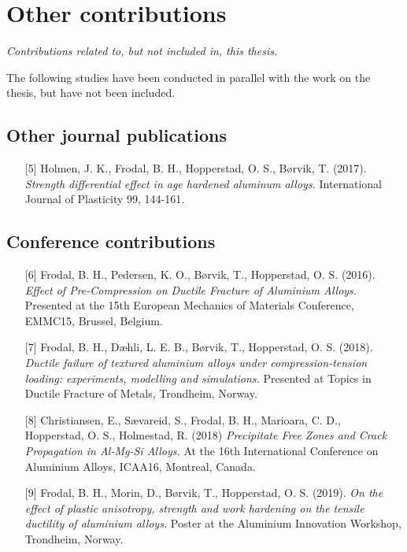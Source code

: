 \newpage

\section*{Other contributions}

\textit{Contributions related to, but not included in, this thesis.}

The following studies have been conducted in parallel with the work on the thesis, but have not
been included. 

\subsection*{Other journal publications}

\begin{itemize}
\item[{[5]}] Holmen, J. K., Frodal, B. H., Hopperstad, O. S., Børvik, T. (2017). \textit{Strength differential effect in age hardened aluminum alloys.} International Journal of Plasticity 99, 144-161.
\end{itemize}

\subsection*{Conference contributions}

\begin{itemize}
    \item[{[6]}] Frodal, B. H., Pedersen, K. O., Børvik, T., Hopperstad, O. S. (2016). \textit{Effect of Pre-Compression on Ductile Fracture of Aluminium Alloys.} Presented at the 15th European Mechanics of Materials Conference, EMMC15, Brussel, Belgium.
    \item[{[7]}] Frodal, B. H., Dæhli, L. E. B., Børvik, T., Hopperstad, O. S. (2018). \textit{Ductile failure of textured aluminium alloys under compression-tension loading: experiments, modelling and simulations.} Presented at Topics in Ductile Fracture of Metals, Trondheim, Norway.
    \item[{[8]}] Christiansen, E., Sævareid, S., Frodal, B. H., Marioara, C. D., Hopperstad, O. S., Holmestad, R. (2018) \textit{Precipitate Free Zones and Crack Propagation in Al-Mg-Si Alloys.} At the 16th International Conference on Aluminium Alloys, ICAA16, Montreal, Canada.
    \item[{[9]}] Frodal, B. H., Morin, D., Børvik, T., Hopperstad, O. S. (2019). \textit{On the effect of plastic anisotropy, strength and work hardening on the tensile ductility of aluminium alloys.} Poster at the Aluminium Innovation Workshop, Trondheim, Norway.
\end{itemize}